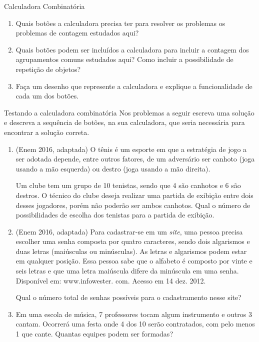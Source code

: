 \begin{task}{Calculadora Combinatória}
\begin{enumerate}
\item Quais botões a calculadora precisa ter para resolver os problemas os problemas de contagem estudados aqui? 

\item Quais botões podem ser incluídos a calculadora para incluir a contagem dos agrupamentos comuns estudados aqui? Como incluir a possibilidade de repetição de objetos?


\item Faça um desenho que represente a calculadora e explique a funcionalidade de cada um dos botões.

\end{enumerate}
\end{task}
\vspace{-1em}
\begin{task}{Testando a calculadora combinatória}
Nos problemas a seguir escreva uma solução e descreva a sequência de botões, na sua calculadora, que seria necessária para encontrar a solução correta.

\begin{enumerate}
\item (Enem 2016, adaptada) O tênis é um esporte em que a estratégia de jogo a ser adotada depende, entre outros fatores, de um adversário ser canhoto (joga usando a mão esquerda) ou destro (joga usando a mão direita). 

Um clube tem um grupo de 10 tenistas, sendo que 4 são canhotos e 6 são destros. O técnico do clube deseja realizar uma partida de exibição entre dois desses jogadores, porém não poderão ser ambos canhotos. Qual o número de possibilidades de escolha dos tenistas para a partida de exibição.  

\item (Enem 2016, adaptada) Para cadastrar-se em um \textit{site}, uma pessoa precisa escolher uma senha composta por quatro caracteres, sendo dois algarismos e duas letras (maiúsculas ou minúsculas). As letras e algarismos podem estar em qualquer posição. Essa pessoa sabe que o alfabeto é composto por vinte e seis letras e que uma letra maiúscula difere da minúscula em uma senha. 
 {Disponível em: www.infowester. com. Acesso em 14 dez. 2012.}
 
Qual o número total de senhas possíveis para o cadastramento nesse site?

\item Em uma escola de música, 7 professores tocam algum instrumento e outros 3 cantam. Ocorrerá uma festa onde 4 dos 10 serão contratados, com pelo menos 1 que cante. Quantas equipes podem ser formadas?

\end{enumerate}
\end{task}

